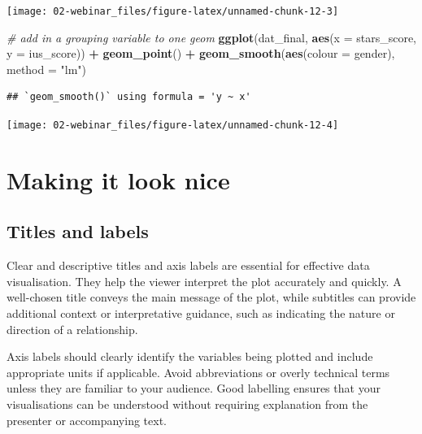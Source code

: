 \documentclass[
  oneside]{book}
\newenvironment{Shaded}{\begin{snugshade}}{\end{snugshade}}
\newcommand{\AttributeTok}[1]{\textcolor[rgb]{0.13,0.29,0.53}{#1}}
\newcommand{\CommentTok}[1]{\textcolor[rgb]{0.56,0.35,0.01}{\textit{#1}}}
\newcommand{\FunctionTok}[1]{\textcolor[rgb]{0.13,0.29,0.53}{\textbf{#1}}}
\newcommand{\NormalTok}[1]{#1}
\newcommand{\SpecialCharTok}[1]{\textcolor[rgb]{0.81,0.36,0.00}{\textbf{#1}}}
\newcommand{\StringTok}[1]{\textcolor[rgb]{0.31,0.60,0.02}{#1}}
\begin{document}
\begin{center}\texttt{[image: 02-webinar\_files/figure-latex/unnamed-chunk-12-3]} \end{center}

\begin{Shaded}
\begin{Highlighting}[]
\CommentTok{\# add in a grouping variable to one geom}
\FunctionTok{ggplot}\NormalTok{(dat\_final, }\FunctionTok{aes}\NormalTok{(}\AttributeTok{x =}\NormalTok{ stars\_score, }\AttributeTok{y =}\NormalTok{ ius\_score)) }\SpecialCharTok{+}
  \FunctionTok{geom\_point}\NormalTok{() }\SpecialCharTok{+}
  \FunctionTok{geom\_smooth}\NormalTok{(}\FunctionTok{aes}\NormalTok{(}\AttributeTok{colour =}\NormalTok{ gender), }\AttributeTok{method =} \StringTok{"lm"}\NormalTok{)}
\end{Highlighting}
\end{Shaded}

\begin{verbatim}
## `geom_smooth()` using formula = 'y ~ x'
\end{verbatim}

\begin{center}\texttt{[image: 02-webinar\_files/figure-latex/unnamed-chunk-12-4]} \end{center}

\section{Making it look nice}\label{making-it-look-nice}

\subsection{Titles and labels}\label{titles-and-labels}

Clear and descriptive titles and axis labels are essential for effective data visualisation. They help the viewer interpret the plot accurately and quickly. A well-chosen title conveys the main message of the plot, while subtitles can provide additional context or interpretative guidance, such as indicating the nature or direction of a relationship.

Axis labels should clearly identify the variables being plotted and include appropriate units if applicable. Avoid abbreviations or overly technical terms unless they are familiar to your audience. Good labelling ensures that your visualisations can be understood without requiring explanation from the presenter or accompanying text.
\end{document}
